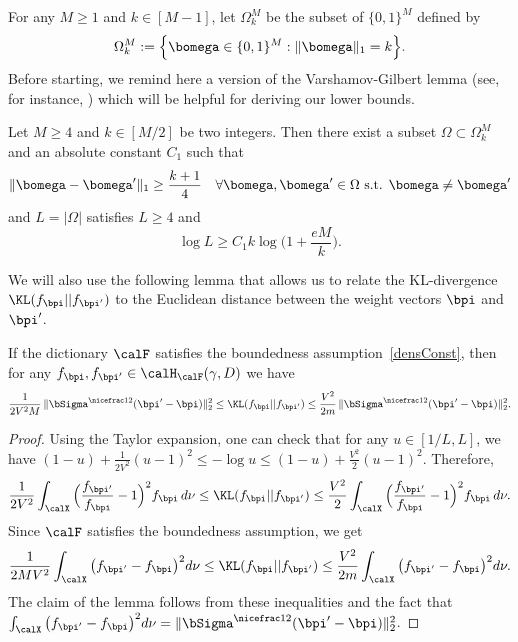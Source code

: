 For any $M\geq 1$ and $k\in [M-1]$, let  $\Omega_k^M$ be the subset of $\{0,1\}^M$ defined by
\begin{equation}
  \Omega_k^M := \Big \{\bomega \in \{0,1\}^M : \|\bomega\|_1=k \Big\}.
\end{equation}
Before starting, we remind here a version of the Varshamov-Gilbert lemma (see, for instance, \citep[Lemma 8.3]{RT11})
which will be helpful for deriving our lower bounds.
\begin{lemma}
\label{rigollet8.3}
Let $M\geq 4$ and $k\in[M/2]$ be two integers. Then there exist a subset $\Omega \subset \Omega_k^M$ and an absolute constant $C_1$
such that
\begin{equation}
  \|\bomega-\bomega'\|_1 \geq \frac{k+1}{4} \quad \forall \bomega,\bomega' \in \Omega \text{ \rm s.t. } \bomega \neq \bomega'
\end{equation}
and $L=|\Omega|$ satisfies $L\ge 4$ and
\begin{equation}
  \log L  \geq C_1 k\log\Big(1+\frac{eM}{ k}\Big).
\end{equation}
\end{lemma}
We will also use the following lemma that allows us to relate the KL-divergence $\KL(f_{\bpi}||f_{\bpi'})$ 
to the Euclidean distance between the weight vectors $\bpi$ and $\bpi'$. 
\begin{lemma}
\label{lemma:KLboundsLT}
If the dictionary $\calF$ satisfies the boundedness assumption~\eqref{densConst}, then for any
$f_{\bpi}, f_{\bpi'}\in \calH_\calF(\gamma,D)$ we have
\begin{equation}
  \frac{1}{2V^2M}\,\|\bSigma^{\nicefrac12}(\bpi'-\bpi)\|_2^2
  \leq \KL(f_{\bpi}||f_{\bpi'})
  \leq \frac{V^2}{2m}\,\|\bSigma^{\nicefrac12}(\bpi'-\bpi)\|_2^2.
\end{equation}
\end{lemma}
\begin{proof}
Using the Taylor expansion, one can check that for any $u\in[1/L,L]$, we
have $(1-u)+ \frac{1}{2V^2}(u-1)^2 \leq -\log u \leq (1-u)+\frac{V^2}{2}(u-1)^2$.
Therefore,
\begin{equation}
  \frac{1}{2V^2}\int_{\calX}\Big(\frac{f_{\bpi'}}{f_{\bpi}}-1\Big)^2f_{\bpi}\,d\nu
  \leq \KL(f_{\bpi}||f_{\bpi'}) \leq \frac{V^2}{2}\int_{\calX}\Big(\frac{f_{\bpi'}}{f_{\bpi}}-1\Big)^2
  f_{\bpi}\,d\nu.
\end{equation}
Since $\calF$ satisfies the boundedness assumption, we get
\begin{equation}
\label{KLboundsLT}
  \frac{1}{2MV^2}\int_{\calX}\big(f_{\bpi'}-f_{\bpi}\big)^2d\nu
  \leq \KL(f_{\bpi}||f_{\bpi'}) \leq \frac{V^2}{2m}\int_{\calX}\big(f_{\bpi'}-f_{\bpi}\big)^2d\nu.
\end{equation}
The claim of the lemma follows from these inequalities and the fact that
$\int_{\calX}\big(f_{\bpi'}-f_{\bpi}\big)^2d\nu = \|\bSigma^{\nicefrac12}(\bpi'-\bpi)\|_2^2$.
\end{proof}



